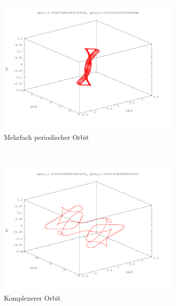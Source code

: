 \begin{figure}
\begin{subfigure}[b]{0.3\textwidth}
                \centering
                \includegraphics[width=\textwidth]{images/phasenraeume/phi2_is_2_phi1_80.png}
                \caption{Mehrfach periodischer Orbit}
        \end{subfigure}
        ~
        \begin{subfigure}[b]{0.3\textwidth}
                \centering
                \includegraphics[width=\textwidth]{images/phasenraeume/phi1_is_phi2_67.png}
                \caption{Komplexerer Orbit}
        \end{subfigure}
        ~
        \begin{subfigure}[b]{0.3\textwidth}
                \centering

\end{subfigure}
\end{figure}
